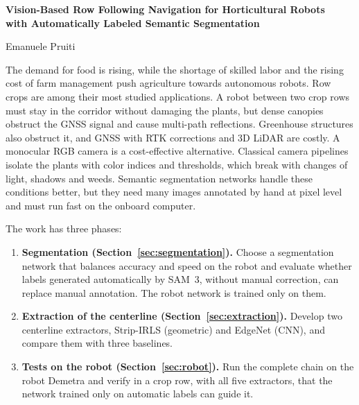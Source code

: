 \documentclass[10pt,a4paper]{article}
\makeatletter
\renewcommand\section{\@startsection{section}{1}{\z@}{-1.4ex plus -0.5ex minus -0.2ex}{0.6ex plus 0.2ex}{\normalfont\large\bfseries}}
\makeatother
\begin{document}
\begin{center}
{\large\bfseries Vision-Based Row Following Navigation for Horticultural Robots\\with Automatically Labeled Semantic Segmentation\par}
\vspace{0.4em}
{Emanuele Pruiti\par}
\end{center}

\section{Introduction}

The demand for food is rising, while the shortage of skilled labor and the rising cost of farm management push agriculture towards autonomous robots. Row crops are among their most studied applications. A robot between two crop rows must stay in the corridor without damaging the plants, but dense canopies obstruct the GNSS signal and cause multi-path reflections. Greenhouse structures also obstruct it, and GNSS with RTK corrections and 3D LiDAR are costly. A monocular RGB camera is a cost-effective alternative. Classical camera pipelines isolate the plants with color indices and thresholds, which break with changes of light, shadows and weeds. Semantic segmentation networks handle these conditions better, but they need many images annotated by hand at pixel level and must run fast on the onboard computer.

The work has three phases:
\begin{enumerate}\setlength{\itemsep}{0pt}
\item \textbf{Segmentation (Section~\ref{sec:segmentation}).} Choose a segmentation network that balances accuracy and speed on the robot and evaluate whether labels generated automatically by SAM~3, without manual correction, can replace manual annotation. The robot network is trained only on them.
\item \textbf{Extraction of the centerline (Section~\ref{sec:extraction}).} Develop two centerline extractors, Strip-IRLS (geometric) and EdgeNet (CNN), and compare them with three baselines.
\item \textbf{Tests on the robot (Section~\ref{sec:robot}).} Run the complete chain on the robot Demetra and verify in a crop row, with all five extractors, that the network trained only on automatic labels can guide it.
\end{enumerate}
\end{document}
